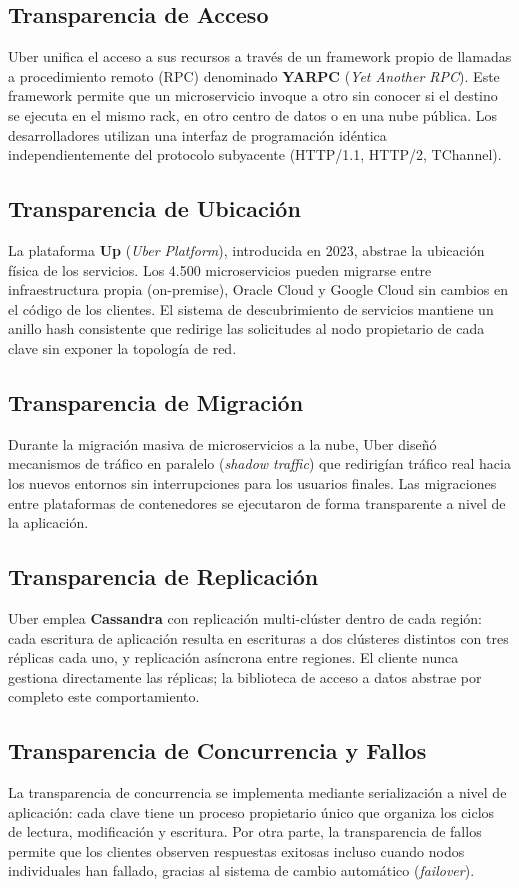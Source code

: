 \documentclass[12pt,a4paper]{article}
\begin{document}
\subsection{Transparencia de Acceso}
Uber unifica el acceso a sus recursos a través de un framework propio de llamadas a procedimiento remoto (RPC) denominado \textbf{YARPC} (\textit{Yet Another RPC}). Este framework permite que un microservicio invoque a otro sin conocer si el destino se ejecuta en el mismo rack, en otro centro de datos o en una nube pública. Los desarrolladores utilizan una interfaz de programación idéntica independientemente del protocolo subyacente (HTTP/1.1, HTTP/2, TChannel).

\subsection{Transparencia de Ubicación}
La plataforma \textbf{Up} (\textit{Uber Platform}), introducida en 2023, abstrae la ubicación física de los servicios. Los 4.500 microservicios pueden migrarse entre infraestructura propia (on-premise), Oracle Cloud y Google Cloud sin cambios en el código de los clientes. El sistema de descubrimiento de servicios mantiene un anillo hash consistente que redirige las solicitudes al nodo propietario de cada clave sin exponer la topología de red.

\subsection{Transparencia de Migración}
Durante la migración masiva de microservicios a la nube, Uber diseñó mecanismos de tráfico en paralelo (\textit{shadow traffic}) que redirigían tráfico real hacia los nuevos entornos sin interrupciones para los usuarios finales. Las migraciones entre plataformas de contenedores se ejecutaron de forma transparente a nivel de la aplicación.

\subsection{Transparencia de Replicación}
Uber emplea \textbf{Cassandra} con replicación multi-clúster dentro de cada región: cada escritura de aplicación resulta en escrituras a dos clústeres distintos con tres réplicas cada uno, y replicación asíncrona entre regiones. El cliente nunca gestiona directamente las réplicas; la biblioteca de acceso a datos abstrae por completo este comportamiento.

\subsection{Transparencia de Concurrencia y Fallos}
La transparencia de concurrencia se implementa mediante serialización a nivel de aplicación: cada clave tiene un proceso propietario único que organiza los ciclos de lectura, modificación y escritura. Por otra parte, la transparencia de fallos permite que los clientes observen respuestas exitosas incluso cuando nodos individuales han fallado, gracias al sistema de cambio automático (\textit{failover}).
\end{document}

